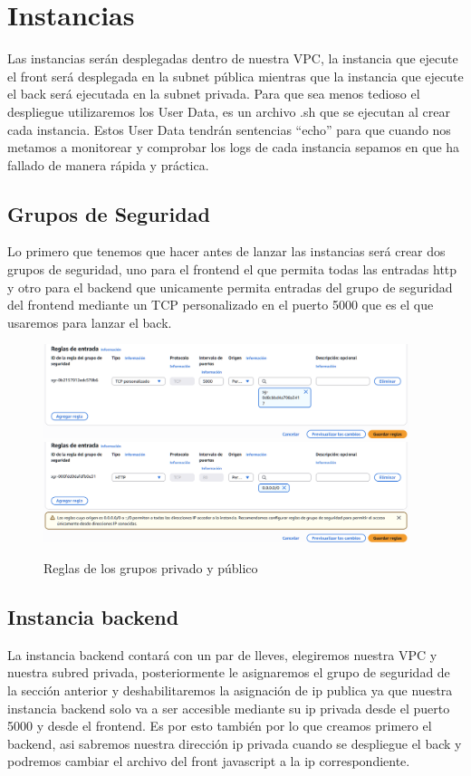 \documentclass{article}
\begin{document}
	\section{Instancias}
	Las instancias serán desplegadas dentro de nuestra VPC, la instancia que ejecute el front será desplegada en la subnet pública mientras que la instancia que ejecute el back será ejecutada en la subnet privada. Para que sea menos tedioso el despliegue utilizaremos los User Data, es un archivo .sh que se ejecutan al crear cada instancia. Estos User Data tendrán sentencias ``echo'' para que cuando nos metamos a monitorear y comprobar los logs de cada instancia sepamos en que ha fallado de manera rápida y práctica.

	\subsection{Grupos de Seguridad}
	Lo primero que tenemos que hacer antes de lanzar las instancias será crear dos grupos de seguridad, uno para el frontend el que permita  todas las entradas http y otro para el backend que unicamente permita entradas del grupo de seguridad del frontend mediante un TCP personalizado en el puerto 5000 que es el que usaremos para lanzar el back.

		
	\begin{figure}[H]
	\centering
	\includegraphics[width=0.95\textwidth]{reglas_gr_privado.png}
	\includegraphics[width=0.95\textwidth]{reglas_gr_publico.png}
	\caption{Reglas de los grupos privado y público}
	\end{figure}

	\subsection{Instancia backend}
	La instancia backend contará con un par de lleves, elegiremos nuestra VPC y nuestra subred privada, posteriormente le asignaremos el grupo de seguridad de la sección anterior y deshabilitaremos la asignación de ip publica ya que nuestra instancia backend solo va a ser accesible mediante su ip privada desde el puerto 5000 y desde el frontend. Es por esto también por lo que creamos primero el backend, asi sabremos nuestra dirección ip privada cuando se despliegue el back y podremos cambiar el archivo del front javascript a la ip correspondiente.
\end{document}
